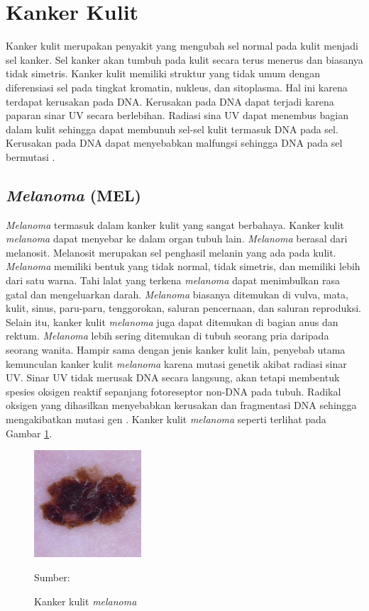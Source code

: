 \section{Kanker Kulit}
Kanker kulit merupakan penyakit yang mengubah sel normal pada kulit menjadi sel kanker. Sel kanker akan tumbuh pada kulit secara terus menerus dan biasanya tidak simetris. Kanker kulit memiliki struktur yang tidak umum dengan diferensiasi sel pada tingkat kromatin, nukleus, dan sitoplasma. Hal ini karena terdapat kerusakan pada DNA. Kerusakan pada DNA dapat terjadi karena paparan sinar UV secara berlebihan. Radiasi sina UV dapat menembus bagian dalam kulit sehingga dapat membunuh sel-sel kulit termasuk DNA pada sel. Kerusakan pada DNA dapat menyebabkan malfungsi sehingga DNA pada sel bermutasi \citep{Nugroho2019}.

    \subsection{\textit{Melanoma} (MEL)}
    \textit{Melanoma} termasuk dalam kanker kulit yang sangat berbahaya. Kanker kulit \textit{melanoma} dapat menyebar ke dalam organ tubuh lain. \textit{Melanoma} berasal dari melanosit. Melanosit merupakan sel penghasil melanin yang ada pada kulit. \textit{Melanoma} memiliki bentuk yang tidak normal, tidak simetris, dan memiliki lebih dari satu warna. Tahi lalat yang terkena \textit{melanoma} dapat menimbulkan rasa gatal dan mengeluarkan darah. \textit{Melanoma} biasanya ditemukan di vulva, mata, kulit, sinus, paru-paru, tenggorokan, saluran pencernaan, dan saluran reproduksi. Selain itu, kanker kulit \textit{melanoma} juga dapat ditemukan di bagian anus dan rektum. \textit{Melanoma} lebih sering ditemukan di tubuh seorang pria daripada seorang wanita. Hampir sama dengan jenis kanker kulit lain, penyebab utama kemunculan kanker kulit \textit{melanoma} karena mutasi genetik akibat radiasi sinar UV. Sinar UV tidak merusak DNA secara langsung, akan tetapi membentuk spesies oksigen reaktif sepanjang fotoreseptor non-DNA pada tubuh. Radikal oksigen yang dihasilkan menyebabkan kerusakan dan fragmentasi DNA sehingga mengakibatkan mutasi gen \citep{Sang2019}. Kanker kulit \textit{melanoma} seperti terlihat pada Gambar \ref{fig:mel}.
    \begin{figure}[H] 
        \begin{center} 
            \includegraphics[width=4cm]{../img/Skin Cancer MEL - Latex.jpg}
            \caption{Kanker kulit \textit{melanoma}} 
            \label{fig:mel}
            Sumber: \citep{Codella2018,Combalia2019,Tschandl2018}
        \end{center} 
    \end{figure}

